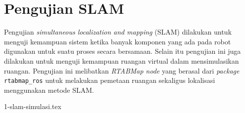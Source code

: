 \section{Pengujian SLAM}
\label{sec:pengujianslam}

Pengujian \emph{simultaneous localization and mapping} (SLAM) dilakukan untuk menguji kemampuan sistem ketika banyak komponen yang ada pada robot digunakan untuk suatu proses secara bersamaan.
Selain itu pengujian ini juga dilakukan untuk menguji kemampuan ruangan virtual dalam mensimulasikan ruangan.
Pengujian ini melibatkan \emph{RTABMap node} yang berasal dari \emph{package} \lstinline{rtabmap_ros} \citep{cit:labbe2019} untuk melakukan pemetaan ruangan sekaligus lokalisasi menggunakan metode SLAM.

{1-slam-simulasi.tex}
